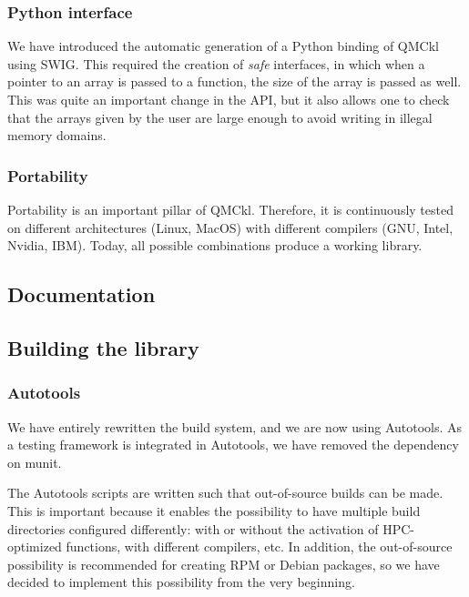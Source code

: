 \subsubsection{Python interface}

We have introduced the automatic generation of a Python binding of
QMCkl using SWIG. This required the creation of \emph{safe} interfaces,
in which when a pointer to an array is passed to a function, the size
of the array is passed as well. This was quite an important change in
the API, but it also allows one to check that the arrays given by the user
are large enough to avoid writing in illegal memory domains.

\subsubsection{Portability}

Portability is an important pillar of QMCkl. Therefore, it is
continuously tested on different architectures (Linux, MacOS) with
different compilers (GNU, Intel, Nvidia, IBM). Today, all possible
combinations produce a working library.


\subsection{Documentation}

\subsection{Building the library}

\subsubsection{Autotools}

We have entirely rewritten the build system, and we are now using
Autotools. As a testing framework is integrated in Autotools, we have
removed the dependency on munit.

The Autotools scripts are written such that out-of-source builds can
be made. This is important because it enables the possibility to have
multiple build directories configured differently: with or without the
activation of HPC-optimized functions, with different compilers, etc.
In addition, the out-of-source possibility is recommended for creating RPM
or Debian packages, so we have decided to implement this possibility
from the very beginning.

